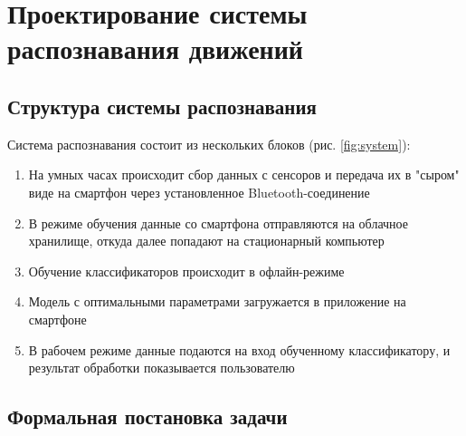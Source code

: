 \chapter{Проектирование системы распознавания движений}


\section{Структура системы распознавания}

Система распознавания состоит из нескольких блоков (рис. \ref{fig:system}):



\begin{enumerate}
\item На умных часах происходит сбор данных с сенсоров и передача их в "сыром" виде на смартфон через установленное Bluetooth-соединение
\item В режиме обучения данные со смартфона отправляются на облачное хранилище, откуда далее попадают на стационарный компьютер
\item Обучение классификаторов происходит в офлайн-режиме
\item Модель с оптимальными параметрами загружается в приложение на смартфоне
\item В рабочем режиме данные подаются на вход обученному классификатору, и результат обработки показывается пользователю
\end{enumerate}



\section{Формальная постановка задачи}


